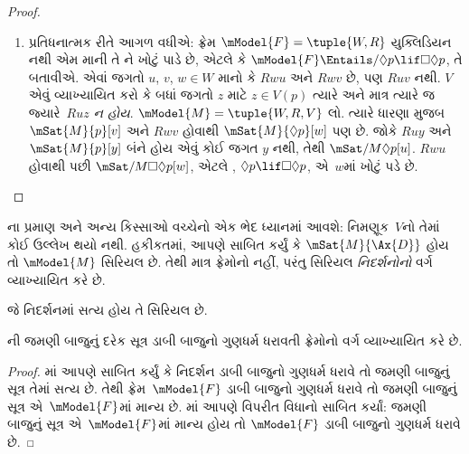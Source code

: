 \begin{proof}
\begin{enumerate}
    $\mModel{M} =\tuple{W, R, V}$ લો. $V$ની વ્યાખ્યા
    મુજબ $Ruz$ ધરાવતા બધા $z$ માટે
    $\mSat{M}{p}[z]$, તેથી $\mSat{M}{\Box p}[u]$.
    પરંતુ ધારણા મુજબ , એટલે કે $\Box p
    \lif \Box \Box p$, એ $u$માં સત્ય છે, તેથી
    $\mSat{M}{\Box \Box
      p}[u]$. $Ruv$ અને $Rvw$ હોવાથી
    $\mSat{M}{p}[w]$; $V$ની વ્યાખ્યા પ્રમાણે આ
    માત્ર $Ruw$ હોય તો જ શક્ય છે, જેમ જોઈએ તેમ.
  \item પ્રતિધનાત્મક રીતે આગળ વધીએ: ફ્રેમ
    $\mModel{F} = \tuple{W, R}$ યુક્લિડિયન નથી એમ
    માની તે ને ખોટું પાડે છે, એટલે કે
    $\mModel{F} \Entails/ \Diamond p \lif
      \Box\Diamond p$, તે બતાવીએ. એવાં જગતો
    $u$, $v$, $w \in W$ માનો કે $Rwu$ અને $Rwv$
    છે, પણ $Ruv$ નથી. $V$ એવું વ્યાખ્યાયિત કરો
    કે બધાં જગતો $z$ માટે $z \in V(p)$ ત્યારે અને
    માત્ર ત્યારે જ જ્યારે~$Ruz$ \emph{ન હોય}.
    $\mModel{M} =\tuple{W, R, V}$ લો. ત્યારે ધારણા
    મુજબ $\mSat{M}{p}[v]$ અને $Rwv$ હોવાથી
    $\mSat{M}{\Diamond p}[w]$ પણ છે. જોકે
    $Ruy$ અને $\mSat{M}{p}[y]$ બંને હોય એવું કોઈ
    જગત $y$ નથી, તેથી
    $\mSat/{M}{\Diamond
      p}[u]$. $Rwu$ હોવાથી પછી
    $\mSat/{M}{\Box\Diamond
      p}[w]$, એટલે , $\Diamond p \lif \Box\Diamond p$,
    એ~$w$માં ખોટું પડે છે.
  \end{enumerate}
\end{proof}

ના પ્રમાણ અને અન્ય કિસ્સાઓ વચ્ચેનો એક
ભેદ ધ્યાનમાં આવશે: નિમણૂક~$V$નો તેમાં કોઈ
ઉલ્લેખ થયો નથી. હકીકતમાં, આપણે સાબિત કર્યું
કે $\mSat{M}{\Ax{D}}$ હોય તો $\mModel{M}$ સિરિયલ
છે. તેથી  માત્ર ફ્રેમોનો નહીં, પરંતુ સિરિયલ
\emph{નિદર્શનોનો} વર્ગ વ્યાખ્યાયિત કરે છે.

\begin{cor}
  જે નિદર્શનમાં  સત્ય હોય તે સિરિયલ છે.
\end{cor}

\begin{cor}
ની જમણી બાજુનું દરેક
સૂત્ર ડાબી બાજુનો ગુણધર્મ ધરાવતી
ફ્રેમોનો વર્ગ વ્યાખ્યાયિત કરે છે.
\end{cor}

\begin{proof}
  માં આપણે સાબિત કર્યું
  કે નિદર્શન ડાબી બાજુનો ગુણધર્મ ધરાવે તો જમણી
  બાજુનું સૂત્ર તેમાં સત્ય છે. તેથી ફ્રેમ~$\mModel{F}$
ડાબી બાજુનો ગુણધર્મ ધરાવે તો જમણી બાજુનું
  સૂત્ર એ~$\mModel{F}$માં માન્ય છે.
  માં આપણે વિપરીત
  વિધાનો સાબિત કર્યાં: જમણી બાજુનું સૂત્ર
  એ~$\mModel{F}$માં માન્ય હોય તો $\mModel{F}$ ડાબી
  બાજુનો ગુણધર્મ ધરાવે છે.
\end{proof}

